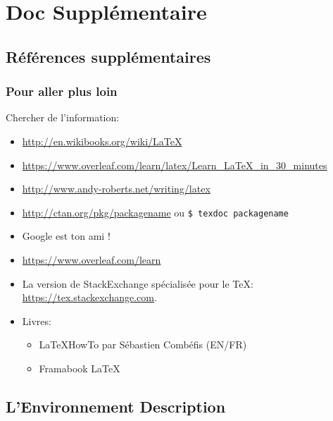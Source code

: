 \section{Doc Supplémentaire}

\subsection{Références supplémentaires}

\begin{frame}
  \frametitle{Pour aller plus loin}
  Chercher de l'information:
    \begin{itemize}
        \item \url{http://en.wikibooks.org/wiki/LaTeX} %
        \item \url{https://www.overleaf.com/learn/latex/Learn_LaTeX_in_30_minutes} %
            \item \url{http://www.andy-roberts.net/writing/latex} %
            \item \url{http://ctan.org/pkg/packagename} ou \lstinline[language=sh,morekeywords={texdoc}]{$ texdoc packagename} %
        \item Google est ton ami ! %
            \item \url{https://www.overleaf.com/learn}
            \item La version de StackExchange spécialisée pour le \TeX:
  \url{https://tex.stackexchange.com}. %
        \item Livres:
        \begin{itemize}
            \item \LaTeX HowTo par Sébastien Combéfis (EN/FR)
            \item Framabook \LaTeX
        \end{itemize}
    \end{itemize}
\end{frame}

\subsection{L'Environnement Description}

